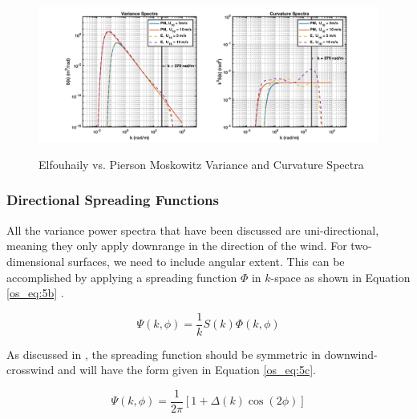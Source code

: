 \begin{figure}[H]
  \begin{center}
\includegraphics[width=6in]{../media/Ocean_Surface/elf_vs_PM_variance_curvature_spectrum.png}
  \end{center}
  \renewcommand{\baselinestretch}{1} \small\normalsize
  \begin{quote}
    \caption[Elfouhaily vs. Pierson Moskowitz Variance and Curvature Spectra]{Elfouhaily vs. Pierson Moskowitz Variance and Curvature Spectra\label{os_fig:2}}
  \end{quote}
\end{figure}
\renewcommand{\baselinestretch}{2} \small\normalsize

\subsubsection{Directional Spreading Functions}
All the variance power spectra that have been discussed are uni-directional, meaning they only apply downrange in the direction of the wind. For two-dimensional surfaces, we need to include angular extent. This can be accomplished by applying a spreading function $\Phi$ in $k$-space as shown in Equation \ref{os_eq:5b} \cite{elfouhaily}.

\begin{equation}
\label{os_eq:5b}
\Psi(k,\phi) = \frac{1}{k}S(k)\Phi(k,\phi)
\end{equation}
\renewcommand{\baselinestretch}{2} \small\normalsize

As discussed in \cite{elfouhaily}, the spreading function should be symmetric in downwind-crosswind and will have the form given in Equation \ref{os_eq:5c}.

\begin{equation}
\label{os_eq:5c}
\Psi(k,\phi) = \frac{1}{2\pi}\left[1 + \Delta(k)\cos(2\phi) \right]
\end{equation}
\renewcommand{\baselinestretch}{2} \small\normalsize

